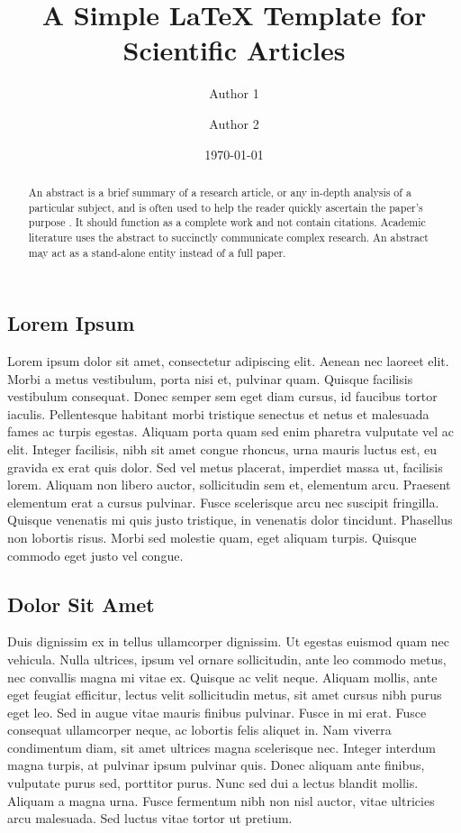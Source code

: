 \documentclass[a4paper,10pt]{article}
\title{A Simple LaTeX Template for Scientific Articles}
\author[1]{Author 1}
\affil[1]{Organization Name}
\author{Author 2}
\date{\today}
\begin{document}
%
\maketitle

\begin{abstract}
    An abstract is a brief summary of a research article, or any in-depth analysis of a particular subject, and is often used to help the reader quickly ascertain the paper's purpose \cite{techwrite}.
    It should function as a complete work and not contain citations.
    Academic literature uses the abstract to succinctly communicate complex research. An abstract may act as a stand-alone entity instead of a full paper.
\end{abstract}

\begin{multicols}{2}


\section{Lorem Ipsum}

Lorem ipsum dolor sit amet, consectetur adipiscing elit. \cite[p. 1]{myarticle} Aenean nec laoreet elit. Morbi a metus vestibulum, porta nisi et, pulvinar quam. Quisque facilisis vestibulum consequat. Donec semper sem eget diam cursus, id faucibus tortor iaculis. Pellentesque habitant morbi tristique senectus et netus et malesuada fames ac turpis egestas. Aliquam porta quam sed enim pharetra vulputate vel ac elit. Integer facilisis, nibh sit amet congue rhoncus, urna mauris luctus est, eu gravida ex erat quis dolor. Sed vel metus placerat, imperdiet massa ut, facilisis lorem. Aliquam non libero auctor, sollicitudin sem et, elementum arcu. Praesent elementum erat a cursus pulvinar. Fusce scelerisque arcu nec suscipit fringilla. Quisque venenatis mi quis justo tristique, in venenatis dolor tincidunt. Phasellus non lobortis risus. Morbi sed molestie quam, eget aliquam turpis. Quisque commodo eget justo vel congue.

\subsection{Dolor Sit Amet}
Duis dignissim ex in tellus ullamcorper dignissim. Ut egestas euismod quam nec vehicula. Nulla ultrices, ipsum vel ornare sollicitudin, ante leo commodo metus, nec convallis magna mi vitae ex. Quisque ac velit neque. Aliquam mollis, ante eget feugiat efficitur, lectus velit sollicitudin metus, sit amet cursus nibh purus eget leo. Sed in augue vitae mauris finibus pulvinar. Fusce in mi erat. Fusce consequat ullamcorper neque, ac lobortis felis aliquet in. Nam viverra condimentum diam, sit amet ultrices magna scelerisque nec. Integer interdum magna turpis, at pulvinar ipsum pulvinar quis. Donec aliquam ante finibus, vulputate purus sed, porttitor purus. Nunc sed dui a lectus blandit mollis. Aliquam a magna urna. Fusce fermentum nibh non nisl auctor, vitae ultricies arcu malesuada. Sed luctus vitae tortor ut pretium. 


\end{multicols}
\end{document}
